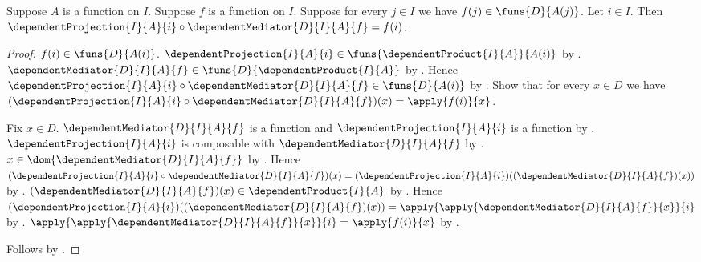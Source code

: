 \begin{theorem}\label{indexed_product_mediator_coordinate}
    Suppose $A$ is a function on $I$.
    Suppose $f$ is a function on $I$.
    Suppose for every $j\in I$ we have $f(j)\in\funs{D}{A(j)}$.
    Let $i\in I$.
    Then $\dependentProjection{I}{A}{i}\circ
        \dependentMediator{D}{I}{A}{f}=f(i)$.
\end{theorem}
\begin{proof}
    $f(i)\in\funs{D}{A(i)}$.
    $\dependentProjection{I}{A}{i}\in
        \funs{\dependentProduct{I}{A}}{A(i)}$ by
        .
    $\dependentMediator{D}{I}{A}{f}\in
        \funs{D}{\dependentProduct{I}{A}}$ by
        .
    Hence $\dependentProjection{I}{A}{i}\circ
        \dependentMediator{D}{I}{A}{f}\in\funs{D}{A(i)}$ by
        .
    Show that for every $x\in D$ we have
        $(\dependentProjection{I}{A}{i}\circ
            \dependentMediator{D}{I}{A}{f})(x)=\apply{f(i)}{x}$.
    \begin{subproof}
        Fix $x\in D$.
        $\dependentMediator{D}{I}{A}{f}$ is a function and
            $\dependentProjection{I}{A}{i}$ is a function by
            .
        $\dependentProjection{I}{A}{i}$ is composable with
            $\dependentMediator{D}{I}{A}{f}$ by
            .
        $x\in\dom{\dependentMediator{D}{I}{A}{f}}$ by .
        Hence $(\dependentProjection{I}{A}{i}\circ
            \dependentMediator{D}{I}{A}{f})(x)
            =(\dependentProjection{I}{A}{i})
                ((\dependentMediator{D}{I}{A}{f})(x))$ by
            .
        $(\dependentMediator{D}{I}{A}{f})(x)
            \in\dependentProduct{I}{A}$ by .
        Hence $(\dependentProjection{I}{A}{i})
            ((\dependentMediator{D}{I}{A}{f})(x))
            =\apply{\apply{\dependentMediator{D}{I}{A}{f}}{x}}{i}$ by
            .
        $\apply{\apply{\dependentMediator{D}{I}{A}{f}}{x}}{i}
            =\apply{f(i)}{x}$ by
            .
    \end{subproof}
    Follows by .
\end{proof}

